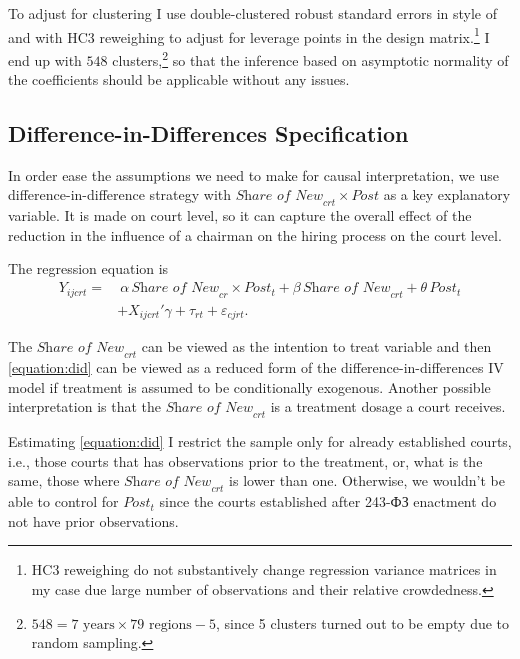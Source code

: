 \documentclass[12pt]{article}
\numberwithin{equation}{section}
\numberwithin{table}{section}
\numberwithin{figure}{section}
\begin{document}
To adjust for clustering I use double-clustered robust standard errors in style of \citet{Thompson2011} and \citet{Cameron2011} with HC3 reweighing to adjust for leverage points in the design matrix.\footnote{HC3 reweighing do not substantively change regression variance matrices in my case due large number of observations and their relative crowdedness.}
I end up with $548$ clusters,\footnote{$548=\text{7 years} \times \text{79 regions}-5$, since 5 clusters turned out to be empty due to random sampling.} so that the inference based on asymptotic normality of the coefficients should be applicable without any issues. 


\subsection{Difference-in-Differences Specification}

In order ease the assumptions we need to make for causal interpretation, we use difference-in-difference strategy with $\textit{Share of New}_{crt}\times \textit{Post}$ as a key explanatory variable. 
It is made on court level, so it can capture the overall effect of the reduction in the influence of a chairman on the hiring process on the court level. 

The regression equation is
\begin{equation}
\begin{aligned}
    Y_{ijcrt}=&~ \alpha\,\textit{Share of New}_{cr}\times\textit{Post}_{t}+\beta\,\textit{Share of New}_{crt}+\theta\,\textit{Post}_{t} \\ & +X_{ijcrt}'\gamma+\tau_{rt}+\varepsilon_{cjrt}.
    \label{equation:did}
\end{aligned}
\end{equation}

The $\textit{Share of New}_{crt}$ can be viewed as the intention to treat variable and then \vref{equation:did} can be viewed as a reduced form of the difference-in-differences IV model if treatment is assumed to be conditionally exogenous. 
Another possible interpretation is that the $\textit{Share of New}_{crt}$ is a treatment dosage a court receives.

Estimating \vref{equation:did} I restrict the sample only for already established courts, i.e., those courts that has observations prior to the treatment, or, what is the same, those where $\textit{Share of New}_{crt}$ is lower than one. Otherwise, we wouldn't be able to control for $\textit{Post}_{t}$ since the courts established after 243-ФЗ enactment do not have prior observations.
\end{document}
